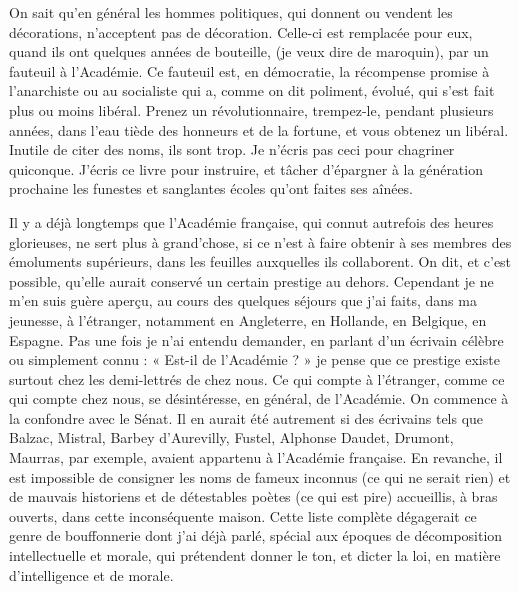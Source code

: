 \documentclass[french,twoside]{book} %
\begin{document}
On sait qu’en général les hommes politiques, qui donnent ou vendent les décorations, n’acceptent pas de décoration. Celle-ci est remplacée pour eux, quand ils ont quelques années de bouteille, (je veux dire de maroquin), par un fauteuil à l’Académie. Ce fauteuil est, en démocratie, la récompense promise à l’anarchiste ou au socialiste qui a, comme on dit poliment, évolué, qui s’est fait plus ou moins libéral. Prenez un révolutionnaire, trempez-le, pendant plusieurs années, dans l’eau tiède des honneurs et de la fortune, et vous obtenez un libéral. Inutile de citer des noms, ils sont trop. Je n’écris pas ceci pour chagriner quiconque. J’écris ce livre pour instruire, et tâcher d’épargner à la génération prochaine les funestes et sanglantes écoles qu’ont faites ses aînées.\par
Il y a déjà longtemps que l’Académie française, qui connut autrefois des heures glorieuses, ne sert plus à grand’chose, si ce n’est à faire obtenir à ses membres des émoluments supérieurs, dans les feuilles auxquelles ils collaborent. On dit, et c’est possible, qu’elle aurait conservé un certain prestige au dehors. Cependant je ne m’en suis guère aperçu, au cours des quelques séjours que j’ai faits, dans ma jeunesse, à l’étranger, notamment en Angleterre, en Hollande, en Belgique, en Espagne. Pas une fois je n’ai entendu demander, en parlant d’un écrivain célèbre ou simplement connu : « Est-il de l’Académie ? » je pense que ce prestige existe surtout chez les demi-lettrés de chez nous. Ce qui compte à l’étranger, comme ce qui compte chez nous, se désintéresse, en général, de l’Académie. On commence à la confondre avec le Sénat. Il en aurait été autrement si des écrivains tels que Balzac, Mistral, Barbey d’Aurevilly, Fustel, Alphonse Daudet, Drumont, Maurras, par exemple, avaient appartenu à l’Académie française. En revanche, il est impossible de consigner les noms de fameux inconnus (ce qui ne serait rien) et de mauvais historiens et de détestables poètes (ce qui est pire) accueillis, à bras ouverts, dans cette inconséquente maison. Cette liste complète dégagerait ce genre de bouffonnerie dont j’ai déjà parlé, spécial aux époques de décomposition intellectuelle et morale, qui prétendent donner le ton, et dicter la loi, en matière d’intelligence et de morale.\par
\end{document}
